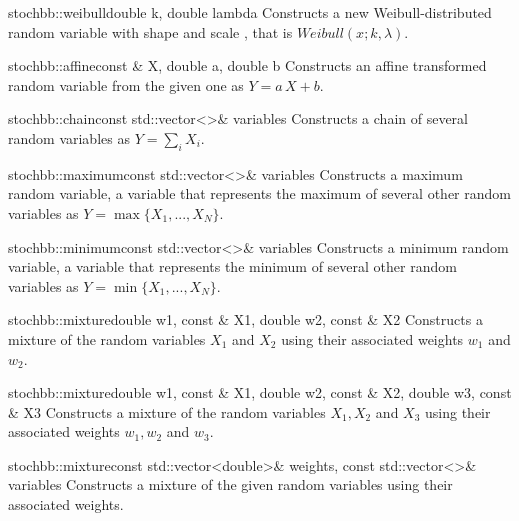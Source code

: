 \begin{deffunc}{stochbb::weibull}{}{double k, double lambda}
Constructs a new Weibull-distributed random variable with shape  and 
scale  , that is $Weibull(x; k, \lambda)$.
\end{deffunc}

\begin{deffunc}{stochbb::affine}{}{const \& X, double a, double b}
Constructs an affine transformed random variable from the given one as $Y = a\,X+b$.
\end{deffunc}

\begin{deffunc}{stochbb::chain}{}{const std::vector<>\& variables}
Constructs a chain of several random variables as $Y = \sum_i X_i$. 
\end{deffunc}

\begin{deffunc}{stochbb::maximum}{}{const std::vector<>\& variables}
Constructs a maximum random variable, a variable that represents the maximum of several other random variables as $Y = \max\{X_1,...,X_N\}$.
\end{deffunc}

\begin{deffunc}{stochbb::minimum}{}{const std::vector<>\& variables}
Constructs a minimum random variable, a variable that represents the minimum of several other random variables as $Y = \min\{X_1,...,X_N\}$.
\end{deffunc}

\begin{deffunc}{stochbb::mixture}{}{double w1, const \& X1, double w2, const \& X2}
Constructs a mixture of the random variables $X_1$ and $X_2$ using their associated weights $w_1$ and $w_2$.
\end{deffunc}

\begin{deffunc}{stochbb::mixture}{}{double w1, const \& X1, double w2, const \& X2, double w3, const \& X3}
Constructs a mixture of the random variables $X_1, X_2$ and $X_3$ using their associated weights $w_1, w_2$ and $w_3$.
\end{deffunc}

\begin{deffunc}{stochbb::mixture}{}{const std::vector<double>\& weights, const std::vector<>\& variables}
Constructs a mixture of the given random variables using their associated weights.
\end{deffunc}

